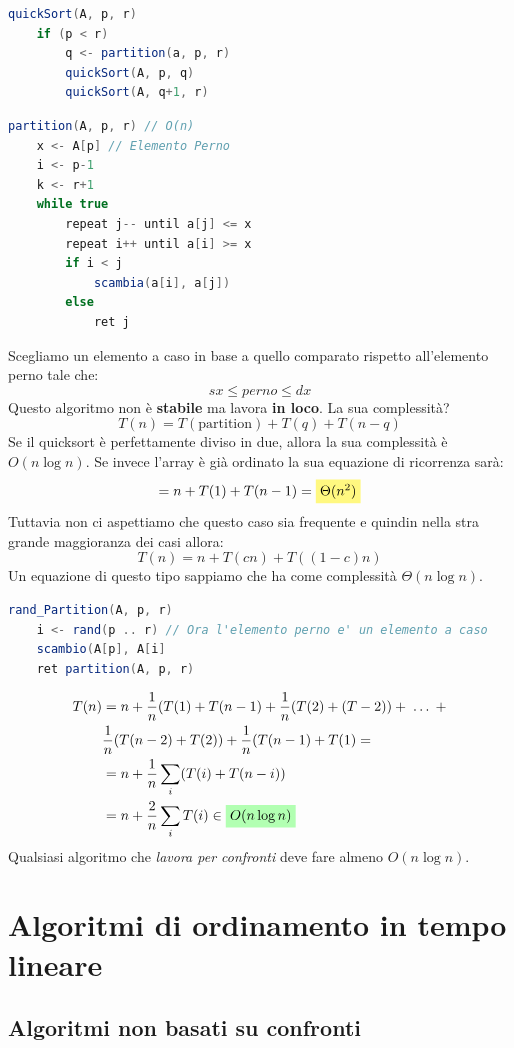 \documentclass[a4paper]{article}
\begin{document}
\begin{lstlisting}[language=Scala]
quickSort(A, p, r)
    if (p < r)
        q <- partition(a, p, r)
        quickSort(A, p, q)
        quickSort(A, q+1, r)
\end{lstlisting}

\begin{lstlisting}[language=Scala]
partition(A, p, r) // O(n)
    x <- A[p] // Elemento Perno
    i <- p-1
    k <- r+1
    while true
        repeat j-- until a[j] <= x
        repeat i++ until a[i] >= x
        if i < j
            scambia(a[i], a[j])
        else
            ret j
\end{lstlisting}
Scegliamo un elemento a caso in base a quello comparato rispetto all'elemento perno tale che:
\[sx \le perno \le dx\]
Questo algoritmo non è \textbf{stabile} ma lavora \textbf{in loco}.
La sua complessità?
\[T(n) = T(\text{partition}) + T(q) + T(n-q)\]
Se il quicksort è perfettamente diviso in due, allora la sua complessità è $O(n \log n)$.
Se invece l'array è già ordinato la sua equazione di ricorrenza sarà:
\[= n + T(1) + T(n-1) = \colorbox{yellow!50!white}{$\Theta(n^2)$}\]
Tuttavia non ci aspettiamo che questo caso sia frequente e quindin nella stra grande maggioranza dei casi allora:
\[T(n) = n + T(cn) + T((1-c)n)\]
Un equazione di questo tipo sappiamo che ha come complessità $\Theta(n \log n)$.
\begin{lstlisting}[language=Scala]
rand_Partition(A, p, r)
    i <- rand(p .. r) // Ora l'elemento perno e' un elemento a caso
    scambio(A[p], A[i]
    ret partition(A, p, r)
\end{lstlisting}

\begin{align*}
    T(n) &= n + \frac{1}{n}(T(1) + T(n-1) + \frac{1}{n}(T(2) + (T-2)) + \; \dots \; + \\
    & \frac{1}{n}(T(n-2) + T(2)) + \frac{1}{n}(T(n-1) + T(1) = \\
    &= n + \frac{1}{n} \sum_{i}(T(i) + T(n-i))\\
    &= n + \frac{2}{n} \sum_{i} T(i) \in \colorbox{green!30!white}{$O(n \log n$)}
\end{align*}
Qualsiasi algoritmo che\textit{ lavora per confronti }deve fare almeno $O(n \log n)$.

\section{Algoritmi di ordinamento in tempo lineare}

\subsection{Algoritmi non basati su confronti}
\end{document}
